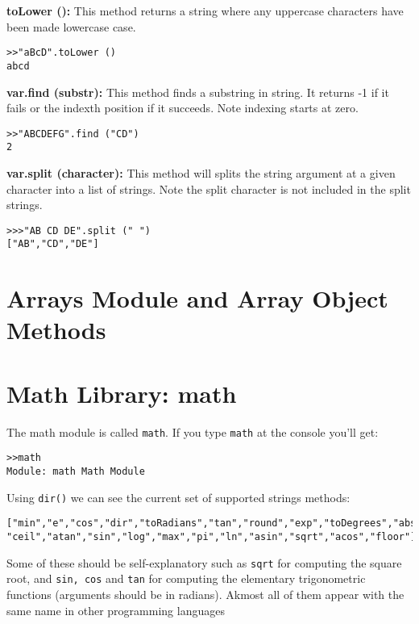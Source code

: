 \colorbox{blue!10}{\bf toLower ():} This method returns a string where any uppercase characters have been made lowercase case.

\begin{lstlisting}
>>"aBcD".toLower ()
abcd
\end{lstlisting}


\colorbox{blue!10}{\bf var.find (substr):} This method finds a substring in string. It returns -1 if it fails or the indexth position if it succeeds. Note indexing starts at zero.

\begin{lstlisting}
>>"ABCDEFG".find ("CD")
2
\end{lstlisting}


\colorbox{blue!10}{\bf var.split (character):} This method will splits the string argument at a given character into a list of strings. Note the split character is not included in the split strings.

\begin{lstlisting}
>>>"AB CD DE".split (" ")
["AB","CD","DE"]
\end{lstlisting}


\section{Arrays Module and Array Object Methods}



\section{Math Library: math}

The math module is called {\tt math}. If you type {\tt math} at the console you'll get:

\begin{lstlisting}
>>math
Module: math Math Module
\end{lstlisting}

Using {\tt dir()} we can see the current set of supported strings methods:

\begin{lstlisting}
["min","e","cos","dir","toRadians","tan","round","exp","toDegrees","abs",
"ceil","atan","sin","log","max","pi","ln","asin","sqrt","acos","floor"]
\end{lstlisting}

Some of these should be self-explanatory such as {\tt sqrt} for computing the square root, and {\tt sin, cos} and {\tt tan} for computing the elementary trigonometric functions (arguments should be in radians). Akmost all of them appear with the same name in other programming languages

